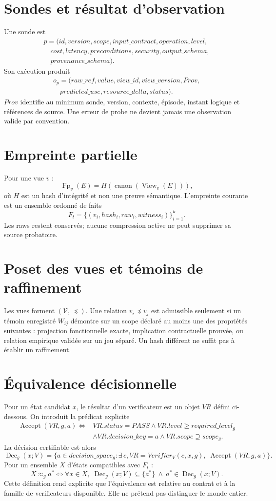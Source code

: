 \documentclass[11pt,a4paper]{report}
\newcommand{\Fp}{\operatorname{Fp}}
\newcommand{\View}{\operatorname{View}}
\newcommand{\Dec}{\operatorname{Dec}}
\begin{document}
\section{Sondes et résultat d'observation}
Une sonde est
\[
\begin{aligned}
p=(id,version,scope,input\_contract,operation,level,\\
\quad cost,latency,preconditions,security,output\_schema,\\
\quad provenance\_schema).
\end{aligned}
\]
Son exécution produit
\[
\begin{aligned}
o_p=(raw\_ref,value,view\_id,view\_version,Prov,\\
\quad predicted\_use,resource\_delta,status).
\end{aligned}
\]
$Prov$ identifie au minimum sonde, version, contexte, épisode, instant logique et références de source. Une erreur de probe ne devient jamais une observation valide par convention.

\section{Empreinte partielle}
Pour une vue $v$ :
\[
\Fp_v(E)=H(\operatorname{canon}(\View_v(E))),
\]
où $H$ est un hash d'intégrité et non une preuve sémantique. L'empreinte courante est un ensemble ordonné de faits
\[
F_t=\{(v_i,hash_i,raw_i,witness_i)\}_{i=1}^{k}.
\]
Les raws restent conservés; aucune compression active ne peut supprimer sa source probatoire.

\section{Poset des vues et témoins de raffinement}
Les vues forment $(\mathcal V,\preceq)$. Une relation $v_i\preceq v_j$ est admissible seulement si un témoin enregistré $W_{ij}$ démontre sur un scope déclaré au moins une des propriétés suivantes : projection fonctionnelle exacte, implication contractuelle prouvée, ou relation empirique validée sur un jeu séparé. Un hash différent ne suffit pas à établir un raffinement.

\section{Équivalence décisionnelle}
Pour un état candidat $x$, le résultat d'un verificateur est un objet $VR$ défini ci-dessous. On introduit la prédicat explicite
\[
\begin{aligned}
\operatorname{Accept}(VR,g,a)\iff{}& VR.status=PASS \land VR.level\ge required\_level_g \\
&\land VR.decision\_key=a \land VR.scope\supseteq scope_g.
\end{aligned}
\]
La décision certifiable est alors
\[
\Dec_g(x;V)=\{a\in decision\_space_g : \exists\,c,VR=Verifier_V(c,x,g),\;\operatorname{Accept}(VR,g,a)\}.
\]
Pour un ensemble $X$ d'états compatibles avec $F_t$ :
\[
X\approx_g a^*\iff \forall x\in X,\;\Dec_g(x;V)\subseteq\{a^*\}\ \land\ a^*\in\Dec_g(x;V).
\]
Cette définition rend explicite que l'équivalence est relative au contrat et à la famille de verificateurs disponible. Elle ne prétend pas distinguer le monde entier.
\end{document}
